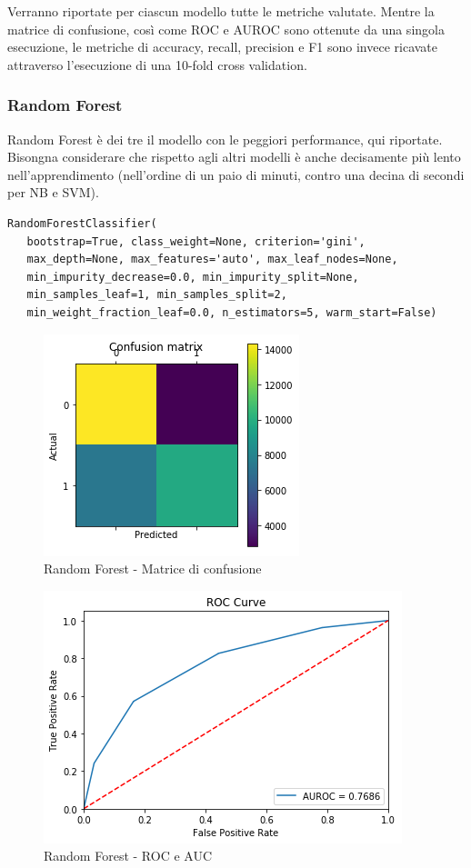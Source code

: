 \documentclass[hidelinks, 12pt]{article}
\begin{document}
Verranno riportate per ciascun modello tutte le metriche valutate. Mentre la matrice di confusione, così come ROC e AUROC sono ottenute da una singola esecuzione, le metriche di accuracy, recall, precision e F1 sono invece ricavate attraverso l'esecuzione di una 10-fold cross validation.


\subsubsection{Random Forest}

Random Forest è dei tre il modello con le peggiori performance, qui riportate. Bisongna considerare che rispetto agli altri modelli è anche decisamente più lento nell'apprendimento (nell'ordine di un paio di minuti, contro una decina di secondi per NB e SVM).

\begin{verbatim}
RandomForestClassifier(
   bootstrap=True, class_weight=None, criterion='gini',
   max_depth=None, max_features='auto', max_leaf_nodes=None,
   min_impurity_decrease=0.0, min_impurity_split=None,
   min_samples_leaf=1, min_samples_split=2,
   min_weight_fraction_leaf=0.0, n_estimators=5, warm_start=False)
\end{verbatim}

\begin{figure}[H]
	\centering
	\includegraphics[scale=0.6]{images/05_00_rf_confmat.png}
	\caption[Random Forest - Matrice di confusione]{Random Forest - Matrice di confusione}
	\label{fig:rf-cm}
\end{figure}

\begin{figure}[H]
\centering
\includegraphics[scale=0.6]{images/05_00_rf_auroc.png}
\caption[Random Forest - ROC e AUC]{Random Forest - ROC e AUC}
\label{fig:rf-auroc}
\end{figure}
\end{document}
